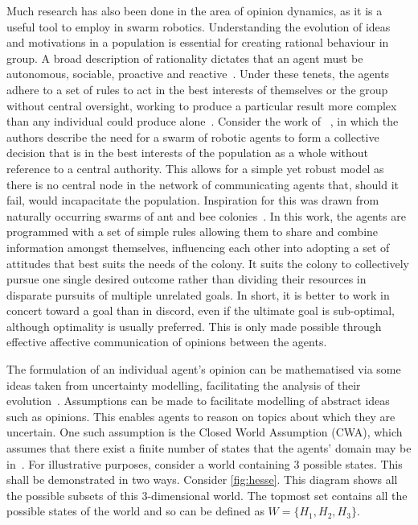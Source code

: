 Much research has also been done in the area of opinion dynamics, as it is a useful tool to employ in swarm robotics. Understanding the evolution of ideas and motivations in a population is essential for creating rational behaviour in group. A broad description of rationality dictates that an agent must be autonomous, sociable, proactive and reactive~\cite{Genesereth1994SoftwareAgents, Castelfranchi1995GuaranteesArchitecture}. Under these tenets, the agents adhere to a set of rules to act in the best interests of themselves or the group without central oversight, working to produce a particular result more complex than any individual could produce alone~\cite{Rawls1971AJustice}. Consider the work of ~\cite{Parker2009CooperativeProblem}, in which the authors describe the need for a swarm of robotic agents to form a collective decision that is in the best interests of the population as a whole without reference to a central authority. This allows for a simple yet robust model as there is no central node in the network of communicating agents that, should it fail, would incapacitate the population. Inspiration for this was drawn from naturally occurring swarms of ant and bee colonies~\cite{Pratt2005BehavioralCurvispinosus, List2009IndependenceSwarms}. In this work, the agents are programmed with a set of simple rules allowing them to share and combine information amongst themselves, influencing each other into adopting a set of attitudes that best suits the needs of the colony. It suits the colony to collectively pursue one single desired outcome rather than dividing their resources in disparate pursuits of multiple unrelated goals. In short, it is better to work in concert toward a goal than in discord, even if the ultimate goal is sub-optimal, although optimality is usually preferred. This is only made possible through effective affective communication of opinions between the agents. 

The formulation of an individual agent's opinion can be mathematised via some ideas taken from uncertainty modelling, facilitating the analysis of their evolution~\cite{Wooldridge1995IntelligentPractice}. Assumptions can be made to facilitate modelling of abstract ideas such as opinions. This enables agents to reason on topics about which they are uncertain. One such assumption is the Closed World Assumption (CWA), which assumes that there exist a finite number of states that the agents' domain may be in~\cite{Jsang2001APROBABILITIES}. For illustrative purposes, consider a world containing $3$ possible states. This shall be demonstrated in two ways. Consider \cref{fig:hesse}. This diagram shows all the possible subsets of this $3$-dimensional world. The topmost set contains all the possible states of the world and so can be defined as $W = \{ H_1, H_2, H_3\}$. 

